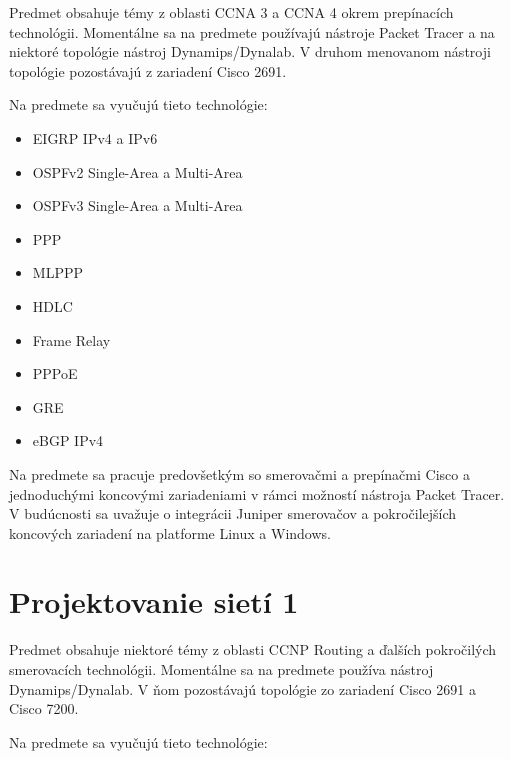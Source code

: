 Predmet obsahuje témy z oblasti CCNA 3 a CCNA 4 okrem prepínacích technológii. Momentálne sa na predmete používajú nástroje Packet Tracer a na niektoré topológie nástroj Dynamips/Dynalab. V druhom menovanom nástroji topológie pozostávajú z zariadení Cisco 2691.

Na predmete sa vyučujú tieto technológie:

\begin{itemize}
    \item EIGRP IPv4 a IPv6
    \item OSPFv2 Single-Area a Multi-Area
    \item OSPFv3 Single-Area a Multi-Area
    \item PPP
    \item MLPPP
    \item HDLC
    \item Frame Relay	
    \item PPPoE
    \item GRE
    \item eBGP IPv4
\end{itemize}

Na predmete sa pracuje predovšetkým so smerovačmi a prepínačmi Cisco a jednoduchými koncovými zariadeniami v rámci možností nástroja Packet Tracer. V budúcnosti sa uvažuje o integrácii Juniper smerovačov a pokročilejších koncových zariadení na platforme Linux a Windows.




\section{Projektovanie sietí 1}

Predmet obsahuje niektoré témy z oblasti CCNP Routing a ďalších pokročilých smerovacích technológii. Momentálne sa na predmete používa nástroj Dynamips/Dynalab. V ňom pozostávajú topológie zo zariadení Cisco 2691 a Cisco 7200.

Na predmete sa vyučujú tieto technológie:

